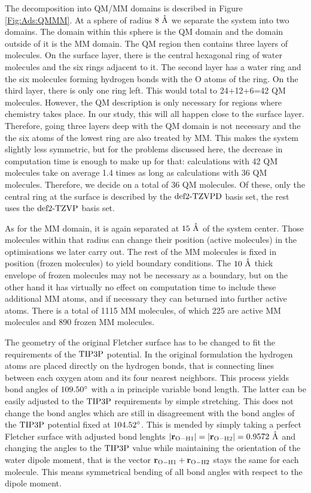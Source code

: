 \documentclass[8.5pt,twoside,twocolumn]{article}
\renewcommand{\Ang}{\mathring{\te{A}}}
\renewcommand\r{\bo r}
\theoremstyle{standard}
\begin{document}
The decomposition into QM/MM domains is described in Figure \ref{Fig:Ads:QMMM}.
At a sphere of radius $8~\Ang$ we separate the system into two domains. The
domain within this sphere is the QM domain and the domain outside of it
is the MM domain. 
The QM region then contains three layers of molecules. On the surface layer,
there is the central hexagonal ring of water molecules and the six
rings adjacent to it. The second layer has a water ring and the six
molecules forming hydrogen bonds with the O atoms of the ring. On 
the third layer, there is only one ring left. This would total
to 24+12+6=42 QM molecules. However, the QM description is only
necessary for regions where chemistry takes place. In our study,
this will all happen close to the surface layer. Therefore, going three
layers deep with the QM domain is not necessary and the the six
atoms of the lowest ring are also treated by MM. This makes the system slightly
less symmetric, but for the problems discussed here, the decrease in
computation time is enough to make up for that: calculations with 42 QM molecules
take on average 1.4 times as long as calculations with 36 QM molecules.
Therefore, we decide on a total of 36 QM molecules. Of these, only the central ring at
the surface is described by the $\text{def2-TZVPD}$ basis set, the rest
uses the $\text{def2-TZVP}$ basis set. 

As for the MM domain, it is again separated at $15~\Ang$ of the system center.
Those molecules within that radius can change their position (active molecules) in the optimisations we
later carry out. The rest of the MM molecules is fixed in position (frozen molecules) to yield
boundary conditions. The $10~\Ang$ thick envelope of frozen molecules may not be
necessary as a boundary, but on the other hand it has virtually no effect on
computation time to include these additional MM atoms, and if necessary they
can beturned into further active atoms. There is a total of 1115 MM molecules,
of which 225 are active MM molecules and 890 frozen MM molecules.

The geometry of the original Fletcher surface has to be changed to fit the requirements
of the $\text{TIP3P}$ potential. In the original formulation the hydrogen atoms
are placed directly on the hydrogen bonds, that is connecting lines between each oxygen atom
and its four nearest neighbors. This process yields bond angles of $109.50\degree$
with a in principle variable bond length. The latter can be easily adjusted
to the $\text{TIP3P}$ requirements by simple stretching. This does not change the bond angles which
are still in disagreement with the bond angles of the $\text{TIP3P}$ potential
fixed at $104.52\degree$. This is mended by simply taking a perfect
Fletcher surface with adjusted bond lenghts $\abs{\r_{\te O - \te H1}}=\abs{\r_{\te O - \te H2}}=0.9572~\Ang$
and changing the angles to the $\text{TIP3P}$ value while maintaining
the orientation of the water dipole moment, that is the vector $\r_{\te O - \te H1}+\r_{\te O - \te H2}$
stays the same for each molecule. This means symmetrical bending of all bond angles with
respect to the dipole moment.
\end{document}
